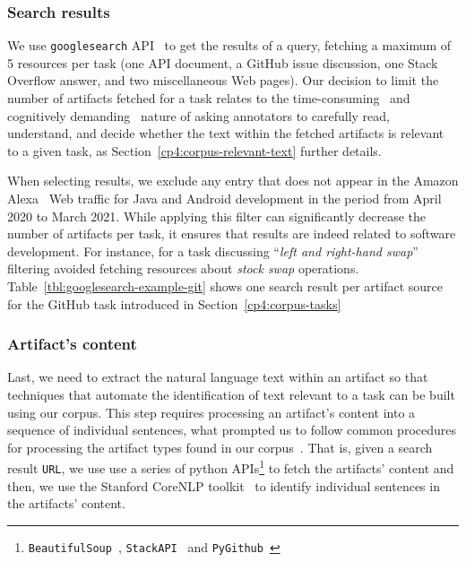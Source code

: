 \subsubsection{Search results}


We use \texttt{googlesearch} API~\cite{googlesearch} to get the results of a query,
fetching a maximum of 5 resources per task 
(one API document, a GitHub issue discussion, one Stack Overflow answer, and two miscellaneous Web pages).
Our decision to limit the number of artifacts fetched for a task relates to the
time-consuming~\cite{Zhang2013, al2017} and cognitively demanding~\cite{Piorkowski2016, Bystrom1995, clark2013relevance} 
nature of asking annotators to carefully read, understand, and decide whether the text
within the fetched artifacts is relevant to a given task, as Section~\ref{cp4:corpus-relevant-text} further details.




When selecting results, we exclude any entry that does not appear in the Amazon Alexa~\cite{alexa} Web traffic for Java and Android development in the period from April 2020 to March 2021. 
While applying this filter can significantly decrease the number of artifacts per task, it ensures that results are indeed related to software development. 
For instance, for a task discussing ``\textit{left and right-hand swap}'' 
filtering avoided fetching resources about  \textit{stock swap} operations.
Table~\ref{tbl:googlesearch-example-git} shows one search result per artifact source for the GitHub task introduced in Section~\ref{cp4:corpus-tasks}







\subsubsection{Artifact's content}

Last, we need to extract the natural language text within an artifact so that 
techniques that automate the identification of text relevant to a task can be built 
using our corpus.  This step requires processing an artifact's content 
into a sequence of individual sentences,
what prompted us to follow common procedures for processing the artifact types found in our corpus~\cite{Arya2019, nadi2020}.
That is, given a search result \texttt{URL}, we use use a series of python 
APIs\footnote{\texttt{BeautifulSoup}~\cite{beautifulsoup4},
\texttt{StackAPI}~\cite{StackAPI} and \texttt{PyGithub}~\cite{PyGithub}}
to fetch the artifacts' content
and then, we use the Stanford CoreNLP toolkit~\cite{CoreNLP} to identify 
individual sentences in the artifacts' content.











